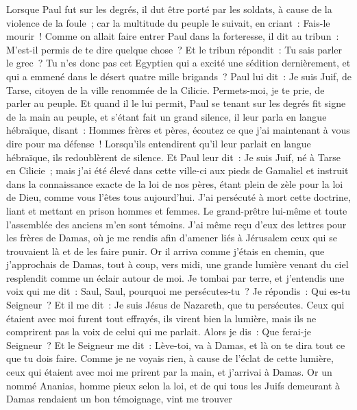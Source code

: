 \begin{multicols}{2}
Lorsque Paul fut sur les degrés, il dut être porté par les soldats, à cause de la violence de la foule~;
car la multitude du peuple le suivait, en criant~: Fais-le mourir~!
Comme on allait faire entrer Paul dans la forteresse, il dit au tribun~: M'est-il permis de te dire quelque chose~? Et le tribun répondit~: Tu sais parler le grec~?
Tu n'es donc pas cet Egyptien qui a excité une sédition dernièrement, et qui a emmené dans le désert quatre mille brigands~?
Paul lui dit~: Je suis Juif, de Tarse, citoyen de la ville renommée de la Cilicie. Permets-moi, je te prie, de parler au peuple.
Et quand il le lui permit, Paul se tenant sur les degrés fit signe de la main au peuple, et s'étant fait un grand silence, il leur parla en langue hébraïque, disant~:
\VerseOne{}Hommes frères et pères, écoutez ce que j'ai maintenant à vous dire pour ma défense~!
Lorsqu'ils entendirent qu'il leur parlait en langue hébraïque, ils redoublèrent de silence. Et Paul leur dit~:
Je suis Juif, né à Tarse en Cilicie~; mais j'ai été élevé dans cette ville-ci aux pieds de Gamaliel et instruit dans la connaissance exacte de la loi de nos pères, étant plein de zèle pour la loi de Dieu, comme vous l'êtes tous aujourd'hui.
J'ai persécuté à mort cette doctrine, liant et mettant en prison hommes et femmes.
Le grand-prêtre lui-même et toute l'assemblée des anciens m'en sont témoins. J'ai même reçu d'eux des lettres pour les frères de Damas, où je me rendis afin d'amener liés à Jérusalem ceux qui se trouvaient là et de les faire punir.
Or il arriva comme j'étais en chemin, que j'approchais de Damas, tout à coup, vers midi, une grande lumière venant du ciel resplendit comme un éclair autour de moi.
Je tombai par terre, et j'entendis une voix qui me dit~: Saul, Saul, pourquoi me persécutes-tu~?
Je répondis~: Qui es-tu Seigneur~? Et il me dit~: Je suis Jésus de Nazareth, que tu persécutes.
Ceux qui étaient avec moi furent tout effrayés, ils virent bien la lumière, mais ils ne comprirent pas la voix de celui qui me parlait. Alors je dis~: Que ferai-je Seigneur~?
Et le Seigneur me dit~: Lève-toi, va à Damas, et là on te dira tout ce que tu dois faire.
Comme je ne voyais rien, à cause de l'éclat de cette lumière, ceux qui étaient avec moi me prirent par la main, et j'arrivai à Damas.
Or un nommé Ananias, homme pieux selon la loi, et de qui tous les Juifs demeurant à Damas rendaient un bon témoignage, vint me trouver

\end{multicols}
